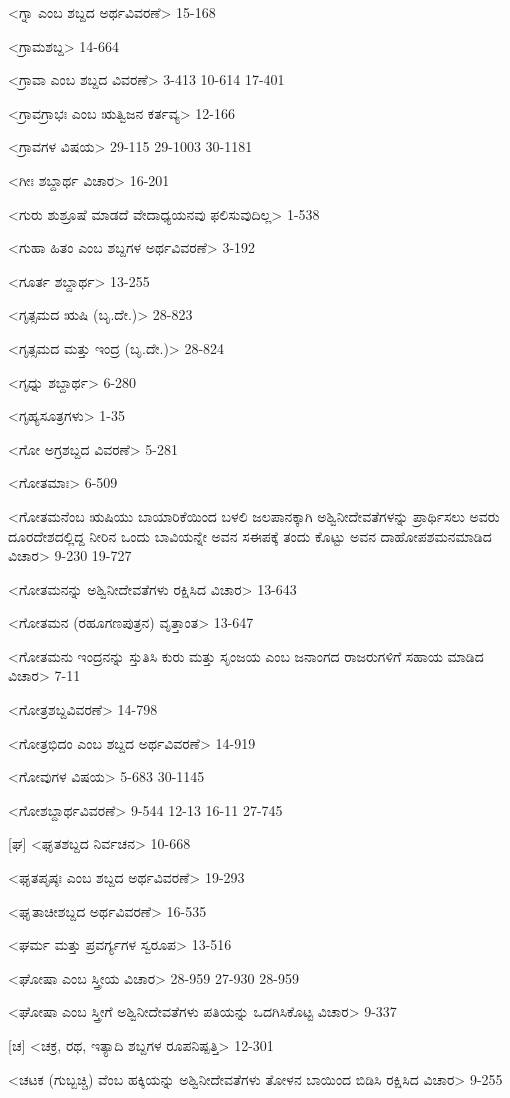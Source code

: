 <ಗ್ನಾ ಎಂಬ ಶಬ್ದದ ಅರ್ಥವಿವರಣೆ>
15-168

<ಗ್ರಾಮಶಬ್ದ>
14-664

<ಗ್ರಾವಾ ಎಂಬ ಶಬ್ದದ ವಿವರಣೆ>
3-413 
10-614
17-401

<ಗ್ರಾವಗ್ರಾಭಃ ಎಂಬ ಋತ್ವಿಜನ ಕರ್ತವ್ಯ>
12-166

<ಗ್ರಾವಗಳ ವಿಷಯ>
29-115 
29-1003
30-1181

<ಗೀಃ ಶಬ್ದಾರ್ಥ ವಿಚಾರ>
16-201

<ಗುರು ಶುಶ್ರೂಷೆ ಮಾಡದೆ ವೇದಾಧ್ಯಯನವು ಫಲಿಸುವುದಿಲ್ಲ>
1-538

<ಗುಹಾ ಹಿತಂ ಎಂಬ ಶಬ್ದಗಳ ಅರ್ಥವಿವರಣೆ>
3-192

<ಗೂರ್ತ ಶಬ್ದಾರ್ಥ>
13-255

<ಗೃತ್ಸಮದ ಋಷಿ (ಬೃ.ದೇ.)>
28-823

<ಗೃತ್ಸಮದ ಮತ್ತು ಇಂದ್ರ (ಬೃ.ದೇ.)>
28-824

<ಗೃಧ್ನು ಶಬ್ದಾರ್ಥ>
6-280

<ಗೃಹ್ಯಸೂತ್ರಗಳು>
1-35

<ಗೋ ಅಗ್ರಶಬ್ದದ ವಿವರಣೆ>
5-281

<ಗೋತಮಾಃ>
6-509

<ಗೋತಮನೆಂಬ ಋಷಿಯು ಬಾಯಾರಿಕೆಯಿಂದ ಬಳಲಿ ಜಲಪಾನಕ್ಕಾಗಿ ಅಶ್ವಿನೀದೇವತೆಗಳನ್ನು ಪ್ರಾರ್ಥಿಸಲು ಅವರು ದೂರದೇಶದಲ್ಲಿದ್ದ ನೀರಿನ ಒಂದು ಬಾವಿಯನ್ನೇ ಅವನ ಸಈಪಕ್ಕೆ ತಂದು ಕೊಟ್ಟು ಅವನ ದಾಹೋಪಶಮನಮಾಡಿದ ವಿಚಾರ>
9-230
19-727

<ಗೋತಮನನ್ನು ಅಶ್ವಿನೀದೇವತೆಗಳು ರಕ್ಷಿಸಿದ ವಿಚಾರ>
13-643

<ಗೋತಮನ (ರಹೂಗಣಪುತ್ರನ) ವೃತ್ತಾಂತ>
13-647

<ಗೋತಮನು ಇಂದ್ರನನ್ನು ಸ್ತುತಿಸಿ ಕುರು ಮತ್ತು ಸೃಂಜಯ ಎಂಬ ಜನಾಂಗದ ರಾಜರುಗಳಿಗೆ ಸಹಾಯ ಮಾಡಿದ ವಿಚಾರ>
7-11

<ಗೋತ್ರಶಬ್ದವಿವರಣೆ>
14-798

<ಗೋತ್ರಭಿದಂ ಎಂಬ ಶಬ್ದದ ಅರ್ಥವಿವರಣೆ>
14-919

<ಗೋವುಗಳ ವಿಷಯ>
5-683
30-1145

<ಗೋಶಬ್ದಾರ್ಥವಿವರಣೆ>
9-544
12-13
16-11
27-745

[ಘ]
<ಘೃತಶಬ್ದದ ನಿರ್ವಚನ>
10-668

<ಘೃತಪೃಷ್ಠಃ ಎಂಬ ಶಬ್ದದ ಅರ್ಥವಿವರಣೆ>
19-293

<ಘೃತಾಚೀಶಬ್ದದ ಅರ್ಥವಿವರಣೆ>
16-535

<ಘರ್ಮ ಮತ್ತು ಪ್ರವರ್ಗ್ಯಗಳ ಸ್ವರೂಪ>
13-516

<ಘೋಷಾ ಎಂಬ ಸ್ತ್ರೀಯ ವಿಚಾರ>
28-959
27-930
28-959

<ಘೋಷಾ ಎಂಬ ಸ್ತ್ರೀಗೆ ಅಶ್ವಿನೀದೇವತೆಗಳು ಪತಿಯನ್ನು ಒದಗಿಸಿಕೊಟ್ಟ ವಿಚಾರ>
9-337

[ಚ]
<ಚಕ್ರ, ರಥ, ಇತ್ಯಾದಿ ಶಬ್ದಗಳ ರೂಪನಿಷ್ಪತ್ತಿ>
12-301

<ಚಟಕ (ಗುಬ್ಬಚ್ಚಿ) ವೆಂಬ ಹಕ್ಕಿಯನ್ನು ಅಶ್ವಿನೀದೇವತೆಗಳು ತೋಳನ ಬಾಯಿಂದ ಬಿಡಿಸಿ ರಕ್ಷಿಸಿದ ವಿಚಾರ>
9-255

